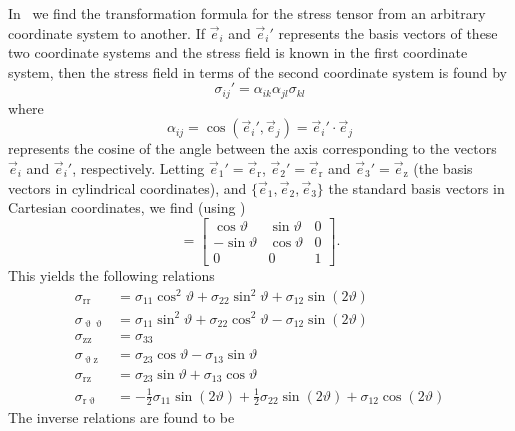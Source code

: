 In~\cite[p. 19]{Gould1994itl} we find the transformation formula for the stress tensor from an arbitrary coordinate system to another. If $\vec{e}_i$ and $\vec{e}_i'$ represents the basis vectors of these two coordinate systems and the stress field is known in the first coordinate system, then the stress field in terms of the second coordinate system is found by
\begin{equation*}
	\sigma_{ij}' = \alpha_{ik}\alpha_{jl}\sigma_{kl}
\end{equation*}
where
\begin{equation*}
	\alpha_{ij} = \cos(\vec{e}_i', \vec{e}_j) = \vec{e}_i'\cdot\vec{e}_j
\end{equation*}
represents the cosine of the angle between the axis corresponding to the vectors $\vec{e}_i$ and $\vec{e}_i'$, respectively. Letting $\vec{e}_1' = \vec{e}_{\mathrm{r}}$, $\vec{e}_2' = \vec{e}_{\mathrm{r}}$ and $\vec{e}_3' = \vec{e}_{\mathrm{z}}$ (the basis vectors in cylindrical coordinates), and $\{\vec{e}_1, \vec{e}_2, \vec{e}_3\}$ the standard basis vectors in Cartesian coordinates, we find (using )
\begin{equation*}
	[\alpha_{ij}] = \begin{bmatrix}
	\cos\vartheta & \sin\vartheta & 0\\
	-\sin\vartheta & \cos\vartheta & 0\\
	0 & 0 & 1
	\end{bmatrix}.
\end{equation*}
This yields the following relations
\begin{align*}
	\sigma_{\mathrm{rr}} &= \sigma_{11}\cos^2\vartheta + \sigma_{22}\sin^2\vartheta + \sigma_{12}\sin(2\vartheta)\\
	\sigma_{\upvartheta\upvartheta} &= \sigma_{11}\sin^2\vartheta + \sigma_{22}\cos^2\vartheta - \sigma_{12}\sin(2\vartheta)\\
	\sigma_{\mathrm{zz}} &= \sigma_{33}\\
	\sigma_{\upvartheta\mathrm{z}} &= \sigma_{23}\cos\vartheta - \sigma_{13}\sin\vartheta\\
	\sigma_{\mathrm{rz}} &= \sigma_{23}\sin\vartheta + \sigma_{13}\cos\vartheta\\
	\sigma_{\mathrm{r}\upvartheta} &= -\frac{1}{2}\sigma_{11}\sin(2\vartheta) + \frac{1}{2}\sigma_{22}\sin(2\vartheta) + \sigma_{12}\cos(2\vartheta)
\end{align*}
The inverse relations are found to be
